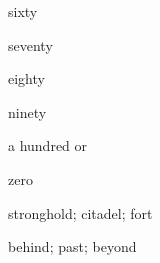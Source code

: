 \begin{flashcard}{\LARGE sixty}
\LARGE {}
\end{flashcard}
\begin{flashcard}{\LARGE seventy}
\LARGE {}
\end{flashcard}
\begin{flashcard}{\LARGE eighty}
\LARGE {}
\end{flashcard}
\begin{flashcard}{\LARGE ninety}
\LARGE {}
\end{flashcard}
\begin{flashcard}{\LARGE a hundred}
\LARGE {} or 
\end{flashcard}
\begin{flashcard}{\LARGE zero}
\LARGE {}
\end{flashcard}
\begin{flashcard}{\LARGE stronghold; citadel; fort}
\LARGE {}
\end{flashcard}
\begin{flashcard}{\LARGE behind; past; beyond}
\LARGE {}
\end{flashcard}

